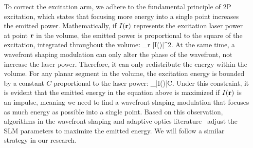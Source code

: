 To correct the excitation arm, we adhere to the fundamental principle of 2P excitation, which states that focusing more energy into a single point increases the emitted power. Mathematically, if $I(\mathbf{r})$ represents the excitation laser power at point 
$\mathbf{r}$ in the volume, the emitted power is proportional to the square of the excitation, integrated throughout the volume:
\BE\label{eq:emitted-power-2P}
\int_r |I(\ptd)|^2.
\EE
At the same time, a wavefront shaping modulation can only alter the phase of the wavefront, not increase the laser power. Therefore, it can only redistribute the energy within the volume. For any planar segment in the volume, the excitation energy is bounded by a constant $C$ proportional to the laser power:
\BE
\int_\ptd |I(\ptd)|\leq C.
\EE 
Under this constraint, it is evident that the emitted energy in the equation above is maximized if $I(\mathbf{r})$ is an impulse, meaning we need to find a wavefront shaping modulation that focuses as much energy as possible into a single point.
Based on this observation, algorithms in the wavefront shaping and adaptive optics literature~\cite{Katz:14,Ji2017review,HampsonBooth21review,Rodriguez2021Adaptive} adjust the SLM parameters to maximize the emitted energy. We will follow a similar strategy in our research.


